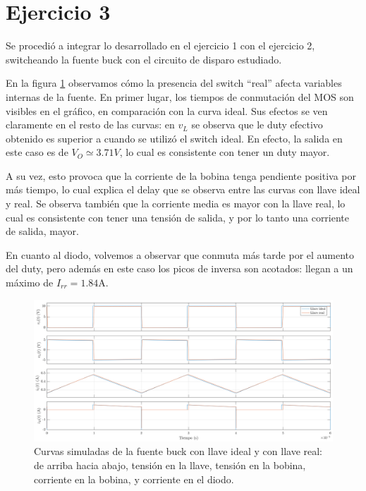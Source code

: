 \documentclass[e4_tp1_main.tex]{subfiles}
\begin{document}
\section{Ejercicio 3}

Se procedi\'o a integrar lo desarrollado en el ejercicio 1 con el ejercicio 2, switcheando la fuente buck con el circuito de disparo estudiado. 

En la figura \ref{fig:curvas3} observamos c\'omo la presencia del switch ``real'' afecta variables internas de la fuente. En primer lugar, los tiempos de conmutaci\'on del MOS son visibles en el gr\'afico, en comparaci\'on con la curva ideal. Sus efectos se ven claramente en el resto de las curvas: en $v_L$ se observa que le duty efectivo obtenido es superior a cuando se utiliz\'o el switch ideal. En efecto, la salida en este caso es de $V_O\simeq3.71V$, lo cual es consistente con tener un duty mayor.

A su vez, esto provoca que la corriente de la bobina tenga pendiente positiva por m\'as tiempo, lo cual explica el delay que se observa entre las curvas con llave ideal y real. Se observa tambi\'en que la corriente media es mayor con la llave real, lo cual es consistente con tener una tensi\'on de salida, y por lo tanto una corriente de salida, mayor.

En cuanto al diodo, volvemos a observar que conmuta m\'as tarde por el aumento del duty, pero adem\'as en este caso los picos de inversa son acotados: llegan a un m\'aximo de $I_{rr}=1.84$A.

\begin{landscape}
	\vspace*{\fill}
	\begin{figure}[ht]
		\centering
		\includegraphics[scale=0.7]{images/ej3/curvas3.png}
		\caption{Curvas simuladas de la fuente buck con llave ideal y con llave real: de arriba hacia abajo, tensi\'on en la llave, tensi\'on en la bobina, corriente en la bobina, y corriente en el diodo.}
		\label{fig:curvas3}
	\end{figure}
	\vspace*{\fill}
\end{landscape}
\end{document}
